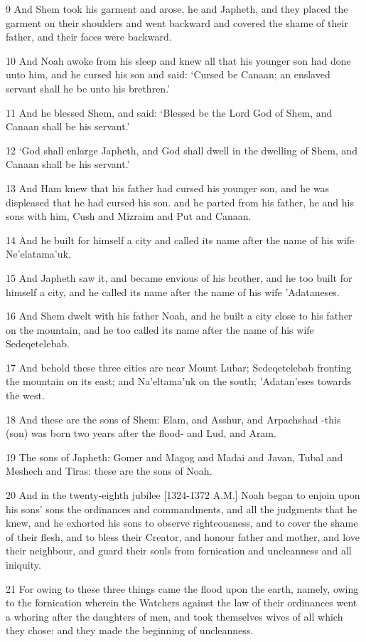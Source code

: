\par 9 And Shem took his garment and arose, he and Japheth, and they placed the garment on their shoulders and went backward and covered the shame of their father, and their faces were backward.
\par 10 And Noah awoke from his sleep and knew all that his younger son had done unto him, and he cursed his son and said: ‘Cursed be Canaan; an enslaved servant shall he be unto his brethren.’
\par 11 And he blessed Shem, and said: ‘Blessed be the Lord God of Shem, and Canaan shall be his servant.’
\par 12 ‘God shall enlarge Japheth, and God shall dwell in the dwelling of Shem, and Canaan shall be his servant.’
\par 13 And Ham knew that his father had cursed his younger son, and he was displeased that he had cursed his son. and he parted from his father, he and his sons with him, Cush and Mizraim and Put and Canaan.
\par 14 And he built for himself a city and called its name after the name of his wife Ne'elatama'uk.
\par 15 And Japheth saw it, and became envious of his brother, and he too built for himself a city, and he called its name after the name of his wife 'Adataneses.
\par 16 And Shem dwelt with his father Noah, and he built a city close to his father on the mountain, and he too called its name after the name of his wife Sedeqetelebab.
\par 17 And behold these three cities are near Mount Lubar; Sedeqetelebab fronting the mountain on its east; and Na'eltama'uk on the south; 'Adatan'eses towards the west.
\par 18 And these are the sons of Shem: Elam, and Asshur, and Arpachshad -this (son) was born two years after the flood- and Lud, and Aram.
\par 19 The sons of Japheth: Gomer and Magog and Madai and Javan, Tubal and Meshech and Tiras: these are the sons of Noah.
\par 20 And in the twenty-eighth jubilee [1324-1372 A.M.] Noah began to enjoin upon his sons' sons the ordinances and commandments, and all the judgments that he knew, and he exhorted his sons to observe righteousness, and to cover the shame of their flesh, and to bless their Creator, and honour father and mother, and love their neighbour, and guard their souls from fornication and uncleanness and all iniquity.
\par 21 For owing to these three things came the flood upon the earth, namely, owing to the fornication wherein the Watchers against the law of their ordinances went a whoring after the daughters of men, and took themselves wives of all which they chose: and they made the beginning of uncleanness.
